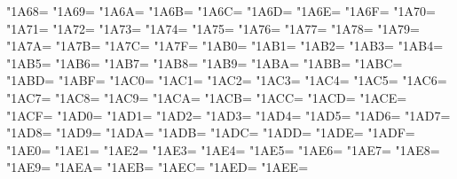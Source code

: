\XeTeXcharclass"1A68=\KclassCM
\XeTeXcharclass"1A69=\KclassCM
\XeTeXcharclass"1A6A=\KclassCM
\XeTeXcharclass"1A6B=\KclassCM
\XeTeXcharclass"1A6C=\KclassCM
\XeTeXcharclass"1A6D=\KclassCM
\XeTeXcharclass"1A6E=\KclassCM
\XeTeXcharclass"1A6F=\KclassCM
\XeTeXcharclass"1A70=\KclassCM
\XeTeXcharclass"1A71=\KclassCM
\XeTeXcharclass"1A72=\KclassCM
\XeTeXcharclass"1A73=\KclassCM
\XeTeXcharclass"1A74=\KclassCM
\XeTeXcharclass"1A75=\KclassCM
\XeTeXcharclass"1A76=\KclassCM
\XeTeXcharclass"1A77=\KclassCM
\XeTeXcharclass"1A78=\KclassCM
\XeTeXcharclass"1A79=\KclassCM
\XeTeXcharclass"1A7A=\KclassCM
\XeTeXcharclass"1A7B=\KclassCM
\XeTeXcharclass"1A7C=\KclassCM
\XeTeXcharclass"1A7F=\KclassCM
\XeTeXcharclass"1AB0=\KclassCM
\XeTeXcharclass"1AB1=\KclassCM
\XeTeXcharclass"1AB2=\KclassCM
\XeTeXcharclass"1AB3=\KclassCM
\XeTeXcharclass"1AB4=\KclassCM
\XeTeXcharclass"1AB5=\KclassCM
\XeTeXcharclass"1AB6=\KclassCM
\XeTeXcharclass"1AB7=\KclassCM
\XeTeXcharclass"1AB8=\KclassCM
\XeTeXcharclass"1AB9=\KclassCM
\XeTeXcharclass"1ABA=\KclassCM
\XeTeXcharclass"1ABB=\KclassCM
\XeTeXcharclass"1ABC=\KclassCM
\XeTeXcharclass"1ABD=\KclassCM
\XeTeXcharclass"1ABF=\KclassCM
\XeTeXcharclass"1AC0=\KclassCM
\XeTeXcharclass"1AC1=\KclassCM
\XeTeXcharclass"1AC2=\KclassCM
\XeTeXcharclass"1AC3=\KclassCM
\XeTeXcharclass"1AC4=\KclassCM
\XeTeXcharclass"1AC5=\KclassCM
\XeTeXcharclass"1AC6=\KclassCM
\XeTeXcharclass"1AC7=\KclassCM
\XeTeXcharclass"1AC8=\KclassCM
\XeTeXcharclass"1AC9=\KclassCM
\XeTeXcharclass"1ACA=\KclassCM
\XeTeXcharclass"1ACB=\KclassCM
\XeTeXcharclass"1ACC=\KclassCM
\XeTeXcharclass"1ACD=\KclassCM
\XeTeXcharclass"1ACE=\KclassCM
\XeTeXcharclass"1ACF=\KclassCM
\XeTeXcharclass"1AD0=\KclassCM
\XeTeXcharclass"1AD1=\KclassCM
\XeTeXcharclass"1AD2=\KclassCM
\XeTeXcharclass"1AD3=\KclassCM
\XeTeXcharclass"1AD4=\KclassCM
\XeTeXcharclass"1AD5=\KclassCM
\XeTeXcharclass"1AD6=\KclassCM
\XeTeXcharclass"1AD7=\KclassCM
\XeTeXcharclass"1AD8=\KclassCM
\XeTeXcharclass"1AD9=\KclassCM
\XeTeXcharclass"1ADA=\KclassCM
\XeTeXcharclass"1ADB=\KclassCM
\XeTeXcharclass"1ADC=\KclassCM
\XeTeXcharclass"1ADD=\KclassCM
\XeTeXcharclass"1ADE=\KclassCM
\XeTeXcharclass"1ADF=\KclassCM
\XeTeXcharclass"1AE0=\KclassCM
\XeTeXcharclass"1AE1=\KclassCM
\XeTeXcharclass"1AE2=\KclassCM
\XeTeXcharclass"1AE3=\KclassCM
\XeTeXcharclass"1AE4=\KclassCM
\XeTeXcharclass"1AE5=\KclassCM
\XeTeXcharclass"1AE6=\KclassCM
\XeTeXcharclass"1AE7=\KclassCM
\XeTeXcharclass"1AE8=\KclassCM
\XeTeXcharclass"1AE9=\KclassCM
\XeTeXcharclass"1AEA=\KclassCM
\XeTeXcharclass"1AEB=\KclassCM
\XeTeXcharclass"1AEC=\KclassCM
\XeTeXcharclass"1AED=\KclassCM
\XeTeXcharclass"1AEE=\KclassCM
